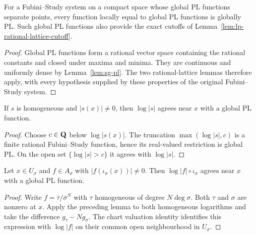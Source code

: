\begin{corollary}\label{lem:lp-pl-sheaf}
\leanok
{}
For a Fubini--Study system on a compact space whose global PL functions separate points,
every function locally equal to global PL functions is globally PL. Such global PL functions
also provide the exact cutoffs of Lemma~\ref{lem:lp-rational-lattice-cutoff}.
\end{corollary}
\begin{proof}
Global PL functions form a rational vector space containing the rational constants and closed
under maxima and minima. They are continuous and uniformly dense by
Lemma~\ref{lem:sg-pl}. The two rational-lattice lemmas therefore apply, with every hypothesis
supplied by these properties of the original Fubini--Study system.
\end{proof}

\begin{lemma}\label{lem:lp-log-germ}
\leanok
{}
If $s$ is homogeneous and $|s(x)|\ne0$, then $\log|s|$ agrees near $x$ with a global PL function.
\end{lemma}
\begin{proof}
Choose $c\in\mathbf{Q}$ below $\log|s(x)|$. The truncation $\max(\log|s|,c)$ is a finite rational
Fubini--Study function, hence its real-valued restriction is global PL. On the open set
$\{\log|s|>c\}$ it agrees with $\log|s|$.
\end{proof}

\begin{lemma}\label{lem:lp-chart-log-germ}
\leanok
{}
Let $x\in U_\sigma$ and $f\in A_\sigma$ with $|f(\iota_\sigma(x))|\ne0$. Then
$\log|f|\circ\iota_\sigma$ agrees near $x$ with a global PL function.
\end{lemma}
\begin{proof}
Write $f=\overline\tau/\overline\sigma^N$ with $\tau$ homogeneous of degree $N\deg\sigma$.
Both $\tau$ and $\sigma$ are nonzero at $x$. Apply the preceding lemma to both homogeneous
logarithms and take the difference $g_\tau-Ng_\sigma$. The chart valuation identity identifies
this expression with $\log|f|$ on their common open neighbourhood in $U_\sigma$.
\end{proof}
